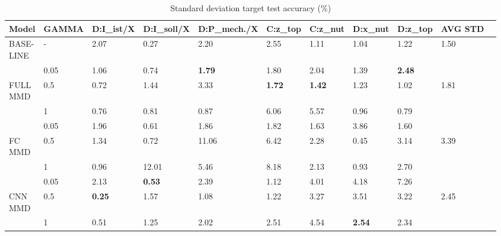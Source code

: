 \begin{sidewaystable}
\centering
\begin{tabular}{lllllllllll}
  \toprule
  Model          & GAMMA    & D:I\_ist/X & D:I\_soll/X & D:P\_mech./X & C:z\_top & C:z\_nut & D:x\_nut & D:z\_top & AVG STD  \\
  \midrule

    \vspace{1cm}

    \thead{BASE- \\ LINE}   & -      & 2.07 & 0.27 & 2.20 & 2.55 & 1.11 & 1.04 & 1.22 & 1.50\\
 
                            & 0.05   & 1.06 & 0.74 & \textbf{1.79} & 1.80 & 2.04 & 1.39 & \textbf{2.48} & \\
    \thead{FULL \\ MMD}     & 0.5    & 0.72 & 1.44 & 3.33 & \textbf{1.72} & \textbf{1.42} & 1.23 & 1.02 & 1.81\\
    
    \vspace{1cm}  
    
                            & 1      & 0.76 & 0.81 & 0.87 & 6.06 & 5.57 & 0.96 & 0.79 & \\



                            & 0.05   & 1.96 & 0.61 & 1.86 & 1.82 & 1.63 & 3.86 & 1.60 & \\
    \thead{FC \\ MMD}       & 0.5    & 1.34 & 0.72 & 11.06 & 6.42 & 2.28 & 0.45 & 3.14 & 3.39\\
    
    \vspace{1cm}
    
                            & 1      & 0.96 & 12.01 & 5.46 & 8.18 & 2.13 & 0.93 & 2.70 & \\
                            & 0.05   & 2.13 & \textbf{0.53} & 2.39 & 1.12 & 4.01 & 4.18 & 7.26 & \\
    \thead{CNN \\ MMD}      & 0.5    & \textbf{0.25} & 1.57 & 1.08 & 1.22 & 3.27 & 3.51 & 3.22 & 2.45\\
                            & 1      & 0.51 & 1.25 & 2.02 & 2.51 & 4.54 & \textbf{2.54} & 2.34 & \\
  \bottomrule
\end{tabular}
\caption{Standard deviation target test accuracy (\%)} \label{tab:Variance_Accuracy} 
\end{sidewaystable}


